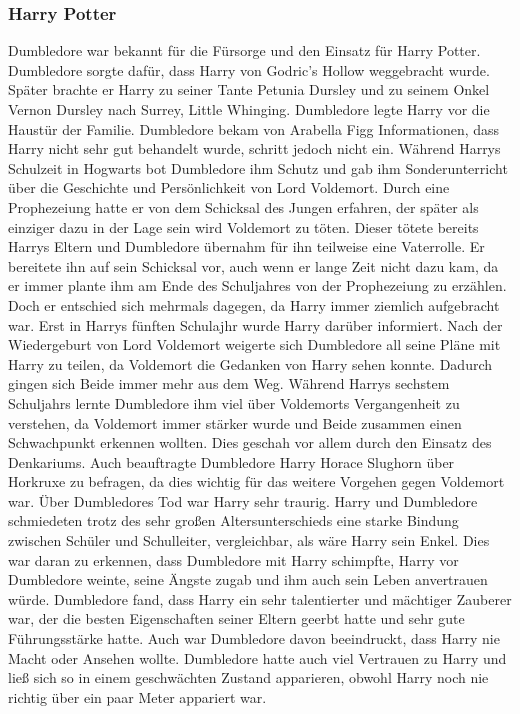 \documentclass[a4paper, 10pt]{article}
\begin{document}
\subsubsection*{\large Harry Potter}
Dumbledore war bekannt für die Fürsorge und den Einsatz für Harry Potter. Dumbledore sorgte dafür, dass Harry von Godric's Hollow weggebracht wurde. Später brachte er Harry zu seiner Tante Petunia Dursley und zu seinem Onkel Vernon Dursley nach Surrey, Little Whinging. Dumbledore legte Harry vor die Haustür der Familie. Dumbledore bekam von Arabella Figg Informationen, dass Harry nicht sehr gut behandelt wurde, schritt jedoch nicht ein. Während Harrys Schulzeit in Hogwarts bot Dumbledore ihm Schutz und gab ihm Sonderunterricht über die Geschichte und Persönlichkeit von Lord Voldemort.
\vspace{10pt}
\newline
{}  
Durch eine Prophezeiung hatte er von dem Schicksal des Jungen erfahren, der später als einziger dazu in der Lage sein wird Voldemort zu töten. Dieser tötete bereits Harrys Eltern und Dumbledore übernahm für ihn teilweise eine Vaterrolle. Er bereitete ihn auf sein Schicksal vor, auch wenn er lange Zeit nicht dazu kam, da er immer plante ihm am Ende des Schuljahres von der Prophezeiung zu erzählen. Doch er entschied sich mehrmals dagegen, da Harry immer ziemlich aufgebracht war. Erst in Harrys fünften Schulajhr wurde Harry darüber informiert.
\vspace{10pt}
\newline
{}  
Nach der Wiedergeburt von Lord Voldemort weigerte sich Dumbledore all seine Pläne mit Harry zu teilen, da Voldemort die Gedanken von Harry sehen konnte. Dadurch gingen sich Beide immer mehr aus dem Weg.
\vspace{10pt}
\newline
{}  
Während Harrys sechstem Schuljahrs lernte Dumbledore ihm viel über Voldemorts Vergangenheit zu verstehen, da Voldemort immer stärker wurde und Beide zusammen einen Schwachpunkt erkennen wollten. Dies geschah vor allem durch den Einsatz des Denkariums. Auch beauftragte Dumbledore Harry Horace Slughorn über Horkruxe zu befragen, da dies wichtig für das weitere Vorgehen gegen Voldemort war. Über Dumbledores Tod war Harry sehr traurig.
\vspace{10pt}
\newline
{}  
Harry und Dumbledore schmiedeten trotz des sehr großen Altersunterschieds eine starke Bindung zwischen Schüler und Schulleiter, vergleichbar, als wäre Harry sein Enkel. Dies war daran zu erkennen, dass Dumbledore mit Harry schimpfte, Harry vor Dumbledore weinte, seine Ängste zugab und ihm auch sein Leben anvertrauen würde. Dumbledore fand, dass Harry ein sehr talentierter und mächtiger Zauberer war, der die besten Eigenschaften seiner Eltern geerbt hatte und sehr gute Führungsstärke hatte. Auch war Dumbledore davon beeindruckt, dass Harry nie Macht oder Ansehen wollte. Dumbledore hatte auch viel Vertrauen zu Harry und ließ sich so in einem geschwächten Zustand apparieren, obwohl Harry noch nie richtig über ein paar Meter appariert war.
\end{document}

